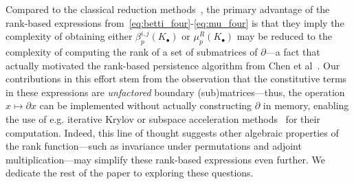 \documentclass[10pt]{article}
\numberwithin{equation}{section}
\newcommand{\+}{%
	\raisebox{0.18ex}{\scaleobj{0.55}{+}}
}
\theoremstyle{definition}
\theoremstyle{definition}
\begin{document}
Compared to the classical reduction methods~\cite{edelsbrunner2022computational, zomorodian2004computing}, the primary advantage of the rank-based expressions from~\eqref{eq:betti_four}-\eqref{eq:mu_four} is that they imply the complexity of obtaining either $\beta_p^{i,j}(K_\bullet)$ or $\mu_p^{R}(K_\bullet)$ may be reduced to the complexity of computing the rank of a set of submatrices of $\partial$---a fact that actually motivated the rank-based persistence algorithm from Chen et al~\cite{chen2011output}.
Our contributions in this effort stem from the observation that the constitutive terms in these expressions are \emph{unfactored} boundary (sub)matrices---thus, the operation $x \mapsto \partial x$ can be implemented without actually constructing $\partial$ in memory, enabling the use of e.g. iterative Krylov or subspace acceleration methods~\cite{golub2013matrix, parlett1994we} for their computation. 
Indeed, this line of thought suggests other algebraic properties of the rank function---such as invariance under permutations and adjoint multiplication---may simplify these rank-based expressions even further.
We dedicate the rest of the paper to exploring these questions. 
\end{document}
